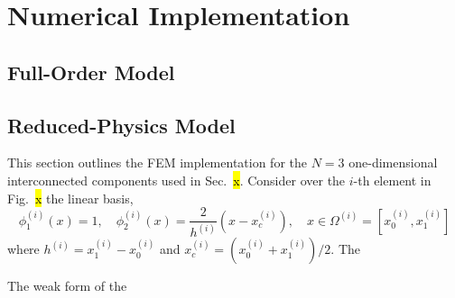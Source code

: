 \appendix

\section{Numerical Implementation}\label{app_implementation}

\subsection{Full-Order Model}

\subsection{Reduced-Physics Model}

This section outlines the FEM implementation for the $N=3$ one-dimensional interconnected components used in Sec.~\hl{x}. Consider over the $i$-th element in Fig.~\hl{x} the linear basis,
\[
    \phi^{(i)}_1(x) = 1,\quad \phi^{(i)}_2(x) = \frac{2}{h^{(i)}}\left(x - x_c^{(i)}\right),\quad x\in\Omega^{(i)} = \left[x_0^{(i)},x_1^{(i)}\right]
\]
where $h^{(i)} = x_1^{(i)} - x_0^{(i)}$ and $x^{(i)}_c = (x^{(i)}_0 + x^{(i)}_1) / 2$. The 

The weak form of the 

